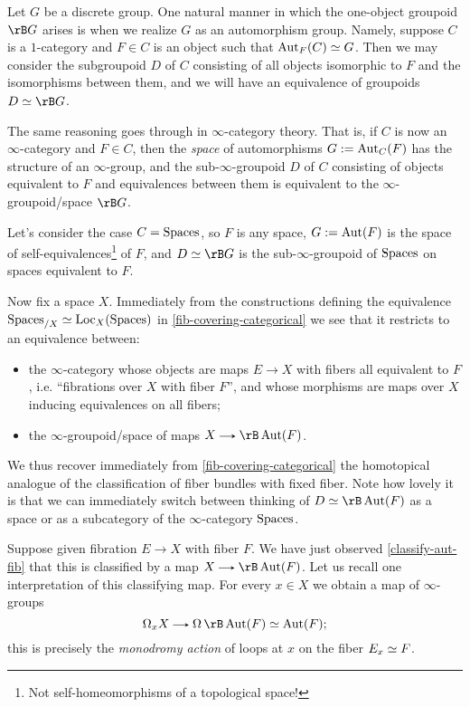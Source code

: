 \begin{nothing}
  \label{classify-aut}
  Let $G$ be a discrete group. One natural manner in which the one-object groupoid $\rB G$ arises is when we realize $G$ as an automorphism group. Namely, suppose $C$ is a $1$-category and $F \in C$ is an object such that $\operatorname{Aut}_F(C) \simeq G$. Then we may consider the subgroupoid $D$ of $C$ consisting of all objects isomorphic to $F$ and the isomorphisms between them, and we will have an equivalence of groupoids $D \iso \rB G$.

  The same reasoning goes through in $\infty$-category theory. That is, if $C$ is now an $\infty$-category and $F \in C$, then the \emph{space} of automorphisms $G \mathrel{:=} \operatorname{Aut}_C(F)$ has the structure of an $\infty$-group, and the sub-$\infty$-groupoid $D$ of $C$ consisting of objects equivalent to $F$ and equivalences between them is equivalent to the $\infty$-groupoid/space $\rB G$.

  \begin{subexample}
    \label{classify-aut-fib}
    Let's consider the case $C = \mathrm{Spaces}$, so $F$ is any space, $G \mathrel{:=} \operatorname{Aut}(F)$ is the space of self-equivalences\footnote{Not self-homeomorphisms of a topological space!} of $F$, and $D \iso \rB G$ is the sub-$\infty$-groupoid of $\mathrm{Spaces}$ on spaces equivalent to $F$.

    Now fix a space $X$. Immediately from the constructions defining the equivalence $\mathrm{Spaces}_{/X} \simeq \operatorname{Loc}_X(\mathrm{Spaces})$ in \cref{fib-covering-categorical} we see that it restricts to an equivalence between:
    \begin{itemize}
    \item the $\infty$-category whose objects are maps $E \to X$ with fibers all equivalent to $F$, i.e. ``fibrations over $X$ with fiber $F$'', and whose morphisms are maps over $X$ inducing equivalences on all fibers;
    \item the $\infty$-groupoid/space of maps $X \to \rB \Aut(F)$.
    \end{itemize}

    We thus recover immediately from \cref{fib-covering-categorical} the homotopical analogue of the classification of fiber bundles with fixed fiber. Note how lovely it is that we can immediately switch between thinking of $D \iso \rB \Aut(F)$ as a space or as a subcategory of the $\infty$-category $\mathrm{Spaces}$.
  \end{subexample}

  \begin{subremark}
    \label{classify-aut-monodromy}
    Suppose given fibration $E \to X$ with fiber $F$. We have just observed \cref{classify-aut-fib} that this is classified by a map $X \to \rB \Aut(F)$. Let us recall one interpretation of this classifying map. For every $x \in X$ we obtain a map of $\infty$-groups
    \[
      \Omega_x X \to \Omega\,\rB \Aut(F) \iso \Aut(F);
    \]
    this is precisely the \emph{monodromy action} of loops at $x$ on the fiber $E_x \simeq F$.
  \end{subremark}
\end{nothing}

